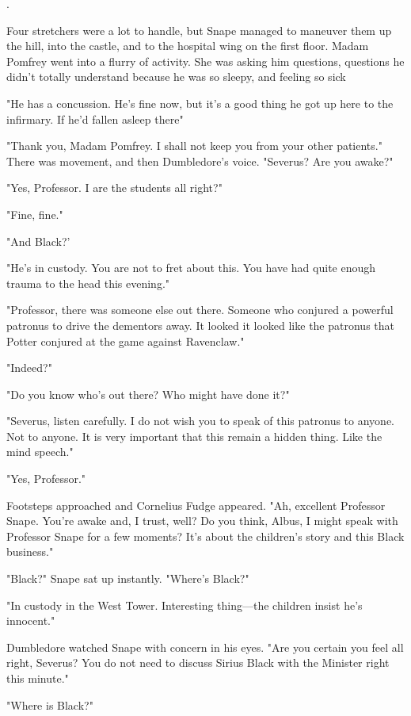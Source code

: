 .

Four stretchers were a lot to handle, but Snape managed to maneuver them up the hill, into the castle, and to the hospital wing on the first floor. Madam Pomfrey went into a flurry of activity. She was asking him questions, questions he didn't totally understand because he was so sleepy, and feeling so sick{\el}

\sbreak

"He has a concussion. He's fine now, but it's a good thing he got up here to the infirmary. If he'd fallen asleep there{\el}"

"Thank you, Madam Pomfrey. I shall not keep you from your other patients." There was movement, and then Dumbledore's voice. "Severus? Are you awake?"

"Yes, Professor. I{\el} are the students all right?"

"Fine, fine."

"And Black?'

"He's in custody. You are not to fret about this. You have had quite enough trauma to the head this evening."

"Professor, there was someone else out there. Someone who conjured a powerful patronus to drive the dementors away. It looked{\el} it looked like the patronus that Potter conjured at the game against Ravenclaw."

"Indeed?"

"Do you know who's out there? Who might have done it?"

"Severus, listen carefully. I do not wish you to speak of this patronus to anyone. Not to anyone. It is very important that this remain a hidden thing. Like the mind speech."

"Yes, Professor."

Footsteps approached and Cornelius Fudge appeared. "Ah, excellent Professor Snape. You're awake and, I trust, well? Do you think, Albus, I might speak with Professor Snape for a few moments? It's about the children's story and this Black business."

"Black?" Snape sat up instantly. "Where's Black?"

"In custody in the West Tower. Interesting thing—the children insist he's innocent."

Dumbledore watched Snape with concern in his eyes. "Are you certain you feel all right, Severus? You do not need to discuss Sirius Black with the Minister right this minute."

"Where is Black?"

